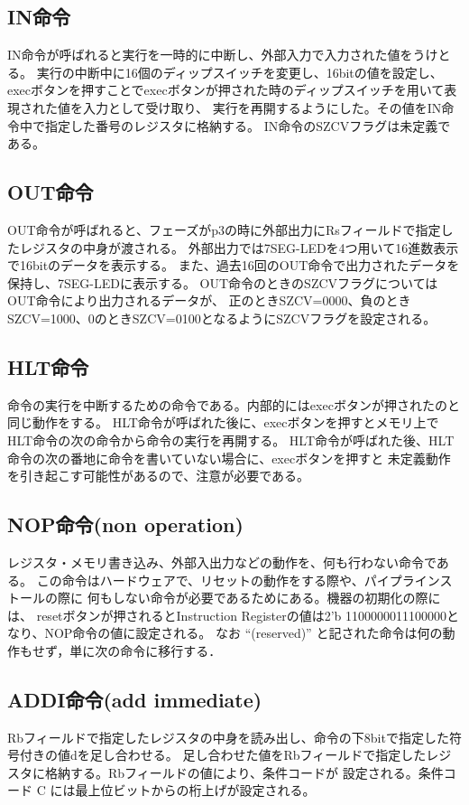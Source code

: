 \documentclass[a4j,titlepage]{jarticle}
\begin{document}
\subsection{IN命令}
IN命令が呼ばれると実行を一時的に中断し、外部入力で入力された値をうけとる。
実行の中断中に16個のディップスイッチを変更し、16bitの値を設定し、
execボタンを押すことでexecボタンが押された時のディップスイッチを用いて表現された値を入力として受け取り、
実行を再開するようにした。その値をIN命令中で指定した番号のレジスタに格納する。
IN命令のSZCVフラグは未定義である。

\subsection{OUT命令}
OUT命令が呼ばれると、フェーズがp3の時に外部出力にRsフィールドで指定したレジスタの中身が渡される。
外部出力では7SEG-LEDを4つ用いて16進数表示で16bitのデータを表示する。
また、過去16回のOUT命令で出力されたデータを保持し、7SEG-LEDに表示する。
OUT命令のときのSZCVフラグについてはOUT命令により出力されるデータが、
正のときSZCV=0000、負のときSZCV=1000、0のときSZCV=0100となるようにSZCVフラグを設定される。

\subsection{HLT命令}
命令の実行を中断するための命令である。内部的にはexecボタンが押されたのと同じ動作をする。
HLT命令が呼ばれた後に、execボタンを押すとメモリ上でHLT命令の次の命令から命令の実行を再開する。
HLT命令が呼ばれた後、HLT命令の次の番地に命令を書いていない場合に、execボタンを押すと
未定義動作を引き起こす可能性があるので、注意が必要である。

\subsection{NOP命令(non operation)}
レジスタ・メモリ書き込み、外部入出力などの動作を、何も行わない命令である。
この命令はハードウェアで、リセットの動作をする際や、パイプラインストールの際に
何もしない命令が必要であるためにある。機器の初期化の際には、
resetボタンが押されるとInstruction Registerの値は2'b 1100000011100000となり、NOP命令の値に設定される。
なお “(reserved)” と記された命令は何の動作もせず，単に次の命令に移行する．

\subsection{ADDI命令(add immediate)}
Rbフィールドで指定したレジスタの中身を読み出し、命令の下8bitで指定した符号付きの値dを足し合わせる。
足し合わせた値をRbフィールドで指定したレジスタに格納する。Rbフィールドの値により、条件コードが
設定される。条件コード C には最上位ビットからの桁上げが設定される。
\end{document}
